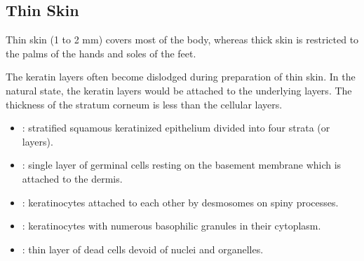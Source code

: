 \newpage
\subsection{Thin Skin}
Thin skin (1 to 2 mm) covers most of the body, whereas thick skin is restricted to the palms of the hands and soles of the feet.

The keratin layers often become dislodged during preparation of thin skin. In the natural state, the keratin layers would be attached to the underlying layers. The thickness of the stratum corneum is less than the cellular layers.
\begin{center}
\end{center}
\begin{multicols}{2}
\begin{itemize}
  \item {}: stratified squamous keratinized epithelium divided into four strata (or layers). 
  
  \begin{center}
  \end{center}
  
  \item {}: single layer of germinal cells resting on the basement membrane which is attached to the dermis.
  
  \begin{center}
  \end{center}
  
  \item {}: keratinocytes attached to each other by desmosomes on spiny processes.
  
  \begin{center}
  \end{center}
  
  \item {}:  keratinocytes with numerous basophilic granules in their cytoplasm.
  
  \begin{center}
  \end{center}
  
  \item {}: thin layer of dead cells devoid of nuclei and organelles.
   

\end{itemize}
\end{multicols}
